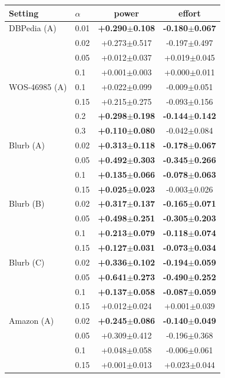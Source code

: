 \begin{tabular}{llcc}
\toprule
Setting & $\alpha$ & power & effort \\
\midrule
DBPedia (A) & 0.01 & \textbf{+0.290$\pm$0.108} & \textbf{-0.180$\pm$0.067} \\
 & 0.02 & +0.273$\pm$0.517 & -0.197$\pm$0.497 \\
 & 0.05 & +0.012$\pm$0.037 & +0.019$\pm$0.045 \\
 & 0.1 & +0.001$\pm$0.003 & +0.000$\pm$0.011 \\
\midrule
WOS-46985 (A) & 0.1 & +0.022$\pm$0.099 & -0.009$\pm$0.051 \\
 & 0.15 & +0.215$\pm$0.275 & -0.093$\pm$0.156 \\
 & 0.2 & \textbf{+0.298$\pm$0.198} & \textbf{-0.144$\pm$0.142} \\
 & 0.3 & \textbf{+0.110$\pm$0.080} & -0.042$\pm$0.084 \\
\midrule
Blurb (A) & 0.02 & \textbf{+0.313$\pm$0.118} & \textbf{-0.178$\pm$0.067} \\
 & 0.05 & \textbf{+0.492$\pm$0.303} & \textbf{-0.345$\pm$0.266} \\
 & 0.1 & \textbf{+0.135$\pm$0.066} & \textbf{-0.078$\pm$0.063} \\
 & 0.15 & \textbf{+0.025$\pm$0.023} & -0.003$\pm$0.026 \\
\midrule
Blurb (B) & 0.02 & \textbf{+0.317$\pm$0.137} & \textbf{-0.165$\pm$0.071} \\
 & 0.05 & \textbf{+0.498$\pm$0.251} & \textbf{-0.305$\pm$0.203} \\
 & 0.1 & \textbf{+0.213$\pm$0.079} & \textbf{-0.118$\pm$0.074} \\
 & 0.15 & \textbf{+0.127$\pm$0.031} & \textbf{-0.073$\pm$0.034} \\
\midrule
Blurb (C) & 0.02 & \textbf{+0.336$\pm$0.102} & \textbf{-0.194$\pm$0.059} \\
 & 0.05 & \textbf{+0.641$\pm$0.273} & \textbf{-0.490$\pm$0.252} \\
 & 0.1 & \textbf{+0.137$\pm$0.058} & \textbf{-0.087$\pm$0.059} \\
 & 0.15 & +0.012$\pm$0.024 & +0.001$\pm$0.039 \\
\midrule
Amazon (A) & 0.02 & \textbf{+0.245$\pm$0.086} & \textbf{-0.140$\pm$0.049} \\
 & 0.05 & +0.309$\pm$0.412 & -0.196$\pm$0.368 \\
 & 0.1 & +0.048$\pm$0.058 & -0.006$\pm$0.061 \\
 & 0.15 & +0.001$\pm$0.013 & +0.023$\pm$0.044 \\
\bottomrule
\end{tabular}

